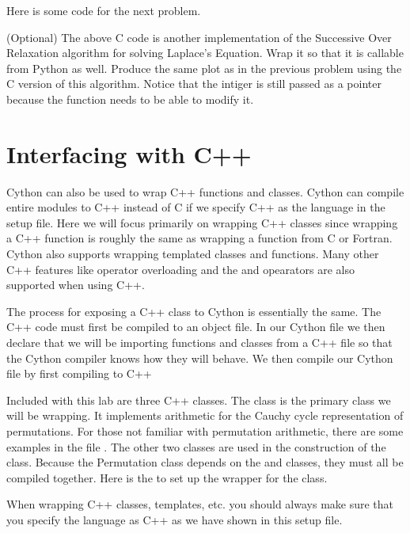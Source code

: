 Here is some code for the next problem.

\begin{problem}
(Optional)
The above C code is another implementation of the Successive Over Relaxation algorithm for solving Laplace's Equation.
Wrap it so that it is callable from Python as well.
Produce the same plot as in the previous problem using the C version of this algorithm.
Notice that the intiger  is still passed as a pointer because the function needs to be able to modify it.
\end{problem}

\section*{Interfacing with C++}

Cython can also be used to wrap C++ functions and classes.
Cython can compile entire modules to C++ instead of C if we specify C++ as the language in the setup file.
Here we will focus primarily on wrapping C++ classes since wrapping a C++ function is roughly the same as wrapping a function from C or Fortran.
Cython also supports wrapping templated classes and functions.
Many other C++ features like operator overloading and the  and  opearators are also supported when using C++.

The process for exposing a C++ class to Cython is essentially the same.
The C++ code must first be compiled to an object file.
In our Cython file we then declare that we will be importing functions and classes from a C++ file so that the Cython compiler knows how they will behave.
We then compile our Cython file by first compiling to C++

Included with this lab are three C++ classes.
The  class is the primary class we will be wrapping.
It implements arithmetic for the Cauchy cycle representation of permutations.
For those not familiar with permutation arithmetic, there are some examples in the file .
The other two classes are used in the construction of the  class.
Because the Permutation class depends on the  and  classes, they must all be compiled together.
Here is the  to set up the wrapper for the  class.



\begin{warn}
When wrapping C++ classes, templates, etc. you should always make sure that you specify the language as C++ as we have shown in this setup file.
\end{warn}

